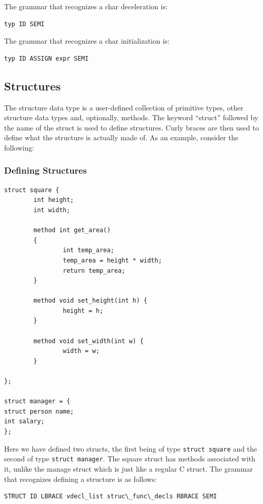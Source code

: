 \documentclass{article}
\begin{document}
The grammar that recognizes a char deceleration is: 
\begin{Verbatim}[frame=single]
typ ID SEMI
\end{Verbatim}

The grammar that recognizes a char initialization is: 
\begin{Verbatim}[frame=single]
typ ID ASSIGN expr SEMI
\end{Verbatim}

\subsection{Structures}
The structure data type is a user-defined collection of primitive types, other structure data types and, optionally, methods. The keyword ``struct'' followed by the name of the struct is used to define structures. Curly braces are then used to define what the structure is actually made of. As an example, consider the following:

\subsubsection{Defining Structures}

\begin{lstlisting}
struct square {
        int height;
        int width;

        method int get_area()
        {
                int temp_area;
                temp_area = height * width;
                return temp_area;
        }

        method void set_height(int h) {
                height = h;
        }

        method void set_width(int w) {
                width = w;
        }

};

struct manager = {
struct person name;
int salary;
};
\end{lstlisting}
Here we have defined two structs, the first being of type \texttt{struct square} and the second of type \texttt{struct manager}. The square struct has methods associated with it, unlike the manage struct which is just like a regular C struct.  The grammar that recognizes defining a structure is as follows:

\begin{Verbatim}[frame=single]
STRUCT ID LBRACE vdecl_list struc\_func\_decls RBRACE SEMI
\end{Verbatim}
\end{document}
